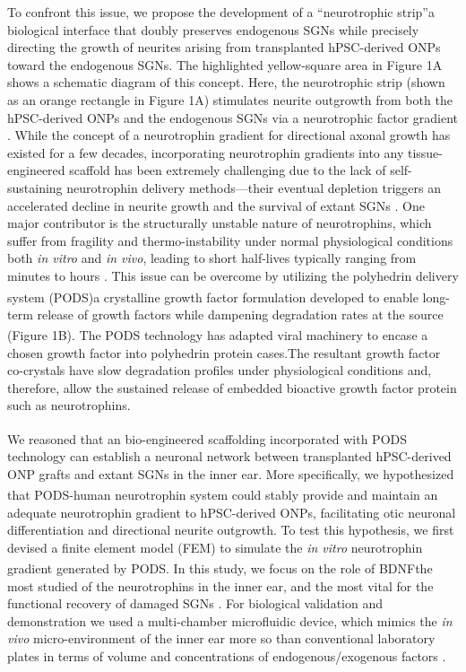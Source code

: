 \documentclass[review]{elsarticle}
\begin{document}
\indent To confront this issue, we propose the development of a “neurotrophic strip”\textemdash a biological interface that doubly preserves endogenous SGNs while precisely directing the growth of neurites arising from transplanted hPSC-derived ONPs toward the endogenous SGNs. The highlighted yellow-square area in Figure 1A shows a schematic diagram of this concept. Here, the neurotrophic strip (shown as an orange rectangle in Figure 1A) stimulates neurite outgrowth from both the hPSC-derived ONPs and the endogenous SGNs via a neurotrophic factor gradient \cite{Goodhill1998}. While the concept of a neurotrophin gradient for directional axonal growth has existed for a few decades, incorporating neurotrophin gradients into any tissue-engineered scaffold has been extremely challenging due to the lack of self-sustaining neurotrophin delivery methods—their eventual depletion triggers an accelerated decline in neurite growth and the survival of extant SGNs \cite{Gillespie2003, Pettingill2008, Shepherd2009}. One major contributor is the structurally unstable nature of neurotrophins, which suffer from fragility and thermo-instability under normal physiological conditions both \textit{in vitro} and \textit{in vivo}, leading to short half-lives typically ranging from minutes to hours \cite{Baseri2012}. This issue can be overcome by utilizing the polyhedrin delivery system (PODS\textsuperscript{\textregistered})\textemdash a crystalline growth factor formulation developed to enable long-term release of growth factors while  dampening degradation rates at the source \cite{Ikeda2001a,Suzuki1997,Mori1993} (Figure 1B). The PODS\textsuperscript{\textregistered} technology has adapted viral machinery to encase a chosen growth factor into polyhedrin protein cases.The resultant growth factor co-crystals have slow degradation profiles under physiological conditions and, therefore, allow the sustained release of embedded bioactive growth factor protein such as neurotrophins.  

\indent We reasoned that an bio-engineered scaffolding incorporated with PODS\textsuperscript{\textregistered} technology can establish a neuronal network between transplanted hPSC-derived ONP grafts and extant SGNs in the inner ear. More specifically, we hypothesized that PODS\textsuperscript{\textregistered}-human neurotrophin system could stably provide and maintain an adequate neurotrophin gradient to hPSC-derived ONPs, facilitating otic neuronal differentiation and directional neurite outgrowth. To test this hypothesis, we first devised a finite element model (FEM) to simulate the \textit{in vitro} neurotrophin gradient generated by PODS\textsuperscript{\textregistered}. In this study, we focus on the role of BDNF\textemdash the most studied of the neurotrophins in the inner ear, and the most vital for the functional recovery of damaged SGNs \cite{green2012}. For biological validation and demonstration we used a multi-chamber microfluidic device, which mimics the \textit{in vivo} micro-environment of the inner ear more so than conventional laboratory plates in terms of volume and concentrations of endogenous/exogenous factors \cite{Meyvantsson2008}. 
\end{document}
